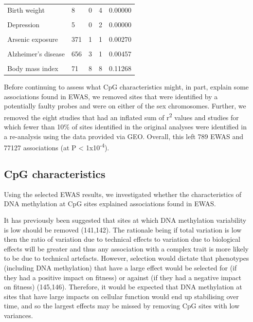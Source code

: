 \documentclass[11pt,oneside]{bristolthesis}
\begin{document}
\begin{table}
{\begin{tabular}[t]{lllll}
Birth weight & 8 & 0 & 4 & 0.00000\\
\cellcolor{gray!6}{Rheumatoid arthritis} & \cellcolor{gray!6}{64} & \cellcolor{gray!6}{8} & \cellcolor{gray!6}{1} & \cellcolor{gray!6}{0.12500}\\
\addlinespace
Depression & 5 & 0 & 2 & 0.00000\\
\cellcolor{gray!6}{Smoking} & \cellcolor{gray!6}{525} & \cellcolor{gray!6}{424} & \cellcolor{gray!6}{19} & \cellcolor{gray!6}{0.80762}\\
Arsenic exposure & 371 & 1 & 1 & 0.00270\\
\cellcolor{gray!6}{Depression} & \cellcolor{gray!6}{39} & \cellcolor{gray!6}{0} & \cellcolor{gray!6}{2} & \cellcolor{gray!6}{0.00000}\\
Alzheimer's disease & 656 & 3 & 1 & 0.00457\\
\addlinespace
\cellcolor{gray!6}{Alzheimer's disease} & \cellcolor{gray!6}{350} & \cellcolor{gray!6}{3} & \cellcolor{gray!6}{1} & \cellcolor{gray!6}{0.00857}\\
Body mass index & 71 & 8 & 8 & 0.11268\\
\bottomrule
\end{tabular}}
\end{table}
\linebreak

Before continuing to assess what CpG characteristics might, in part, explain some associations found in EWAS, we removed sites that were identified by a potentially faulty probes and were on either of the sex chromosomes. Further, we removed the eight studies that had an inflated sum of r\textsuperscript{2} values and studies for which fewer than 10\% of sites identified in the original analyses were identified in a re-analysis using the data provided via GEO. Overall, this left 789 EWAS and 77127 associations (at P \textless{} 1x10\textsuperscript{-4}).

\hypertarget{cpg-characteristics}{%
\subsection{CpG characteristics}\label{cpg-characteristics}}

Using the selected EWAS results, we investigated whether the characteristics of DNA methylation at CpG sites explained associations found in EWAS.

It has previously been suggested that sites at which DNA methylation variability is low should be removed (141,142). The rationale being if total variation is low then the ratio of variation due to technical effects to variation due to biological effects will be greater and thus any association with a complex trait is more likely to be due to technical artefacts. However, selection would dictate that phenotypes (including DNA methylation) that have a large effect would be selected for (if they had a positive impact on fitness) or against (if they had a negative impact on fitness) (145,146). Therefore, it would be expected that DNA methylation at sites that have large impacts on cellular function would end up stabilising over time, and so the largest effects may be missed by removing CpG sites with low variances.
\end{document}
